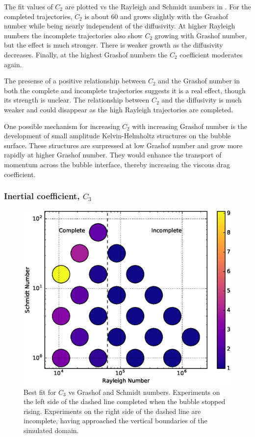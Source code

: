 The fit values of $C_2$ are plotted vs the Rayleigh and Schmidt numbers in .
For the completed trajectories, $C_2$ is about $60$ and grows slightly with the Grashof number while being nearly independent of the diffusivity.
At higher Rayleigh numbers the incomplete trajectories also show $C_2$ growing with Grashof number, but the effect is much stronger.
There is weaker growth as the diffusivity decreases.
Finally, at the highest Grashof numbers the $C_2$ coefficient moderates again.

The presense of a positive relationship between $C_2$ and the Grashof number in both the complete and incomplete trajectories suggests it is a real effect, though its strength is unclear.
The relationship between $C_2$ and the diffusivity is much weaker and could disappear as the high Rayleigh trajectories are completed.

One possible mechanism for increasing $C_2$ with increasing Grashof number is the development of small amplitude Kelvin-Helmholtz structures on the bubble surface.
These structures are surpressed at low Grashof number and grow more rapidly at higher Grashof number.
They would enhance the transport of momentum across the bubble interface, thereby increasing the viscous drag coefficient.

\subsubsection{Inertial coefficient, $C_3$}
\begin{figure}
\includegraphics[width=\columnwidth]{figs/C3-vs-Rayleigh-Schmidt}
\caption{ 
  Best fit for $C_3$ vs Grashof and Schmidt numbers.
  Experiments on the left side of the dashed line completed when the bubble stopped rising.
  Experiments on the right side of the dashed line are incomplete, having approached the vertical boundaries of the simulated domain.
}
\end{figure}

